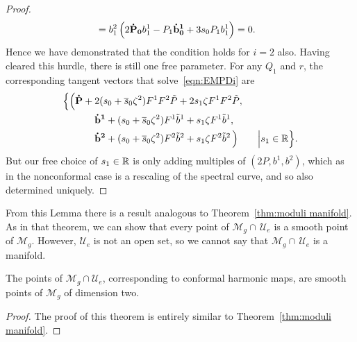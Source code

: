 \documentclass{article}
\begin{document}
\begin{lem}[Case (e)]
\begin{proof}
\begin{align*}
&= b^2_1\left(2 \mathbf{\dot{P}_0} b^1_1 - P_1 \mathbf{\dot{b}^1_0} + 3 s_0 P_1 b^1_1 \right) = 0.
\end{align*}
Hence we have demonstrated that the condition holds for $i=2$ also. Having cleared this hurdle, there is still one free parameter. For any $Q_1$ and $r$, the corresponding tangent vectors that solve~\eqref{eqn:EMPDi} are
\begin{align*}
\Big\{
\Big(&\mathbf{\dot P} + 2(s_0+\overline{s}_0\zeta^2) F^1F^2\tilde{P} + 2s_1\zeta F^1F^2\tilde{P}, \\
&\qquad\mathbf{\dot b^1} + (s_0+\overline{s}_0\zeta^2) F^1\tilde{b}^1 + s_1\zeta F^1\tilde{b}^1, \\
&\qquad\mathbf{\dot b^2} + (s_0+\overline{s}_0\zeta^2) F^2\tilde{b}^2 + s_1\zeta F^2\tilde{b}^2 \,\Big)
\qquad\Big\vert s_1 \in \mathbb{R}
\Big\}.
\end{align*}
But our free choice of $s_1\in\mathbb{R}$ is only adding multiples of $(2P,b^1,b^2)$, which as in the nonconformal case is a rescaling of the spectral curve, and so also determined uniquely.
\end{proof}
\end{lem}

From this Lemma there is a result analogous to Theorem~\ref{thm:moduli manifold}. As in that theorem, we can show that every point of $\mathcal{M}_g \cap\, \mathcal{U}_{e}$ is a smooth point of $\mathcal{M}_g$. However, $\mathcal{U}_{e}$ is not an open set, so we cannot say that $\mathcal{M}_g \cap\, \mathcal{U}_{e}$ is a manifold. 

\begin{thm}\label{thm:conformal moduli manifold}
The points of $\mathcal{M}_g \cap \mathcal{U}_{e}$, corresponding to conformal harmonic maps, are smooth points of $\mathcal{M}_g$ of dimension two.

\begin{proof}
The proof of this theorem is entirely similar to Theorem~\ref{thm:moduli manifold}. 
\end{proof}
\end{thm}

\end{document}
